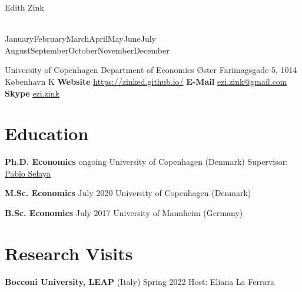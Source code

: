 \documentclass[10pt,a4paper]{article}
\newcommand*{\printdate}{%
   \ifcase \month\or January\or February\or March\or April\or May\or June\or July\or
    August\or September\or October\or November\or December\fi \space \number\year}
\begin{document}
\begin{center}
\begin{huge}
Edith Zink
\end{huge} \\
\printdate
\end{center}

\begin{multicols}{2}
University of Copenhagen \newline
Department of Economics \newline
Øster Farimagsgade 5, 1014 København K
\newline
\textbf{Website} \url{https://zinked.github.io/}
\newline
\textbf{E-Mail} \url{ezi.zink@gmail.com}
\newline
\textbf{Skype} \href{https://join.skype.com/invite/IuTKaP5eDilS}{ezi.zink}


\end{multicols}

\section*{Education}
\textbf{Ph.D. Economics} \hfill ongoing
\newline
University of Copenhagen (Denmark) \newline
Supervisor: \href{http://web.econ.ku.dk/pabloselaya/}{Pablo Selaya}
\vspace{1em}

\textbf{M.Sc. Economics} \hfill July 2020
\newline
University of Copenhagen (Denmark)
\vspace{1em}

\textbf{B.Sc. Economics} \hfill July 2017
\newline
University of Mannheim (Germany) 

\section*{Research Visits}
\textbf{Bocconi University, LEAP} (Italy) \hfill Spring 2022 \newline
Host: Eliana La Ferrara
\vspace{1em}
\end{document}

